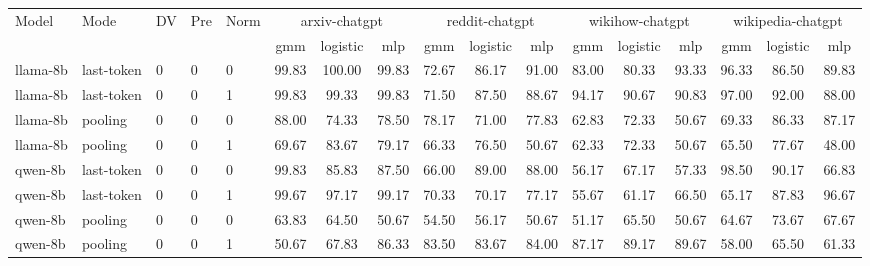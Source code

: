 \begin{tabular}{lllll|ccc|ccc|ccc|ccc}
\toprule
Model & Mode & DV & Pre & Norm & \multicolumn{3}{c}{arxiv-chatgpt} & \multicolumn{3}{c}{reddit-chatgpt} & \multicolumn{3}{c}{wikihow-chatgpt} & \multicolumn{3}{c}{wikipedia-chatgpt} \\
 &  &  &  &  & gmm & logistic & mlp & gmm & logistic & mlp & gmm & logistic & mlp & gmm & logistic & mlp \\
\midrule
llama-8b & last-token & 0 & 0 & 0 & 99.83 & 100.00 & 99.83 & 72.67 & 86.17 & 91.00 & 83.00 & 80.33 & 93.33 & 96.33 & 86.50 & 89.83 \\
llama-8b & last-token & 0 & 0 & 1 & 99.83 & 99.33 & 99.83 & 71.50 & 87.50 & 88.67 & 94.17 & 90.67 & 90.83 & 97.00 & 92.00 & 88.00 \\
llama-8b & pooling & 0 & 0 & 0 & 88.00 & 74.33 & 78.50 & 78.17 & 71.00 & 77.83 & 62.83 & 72.33 & 50.67 & 69.33 & 86.33 & 87.17 \\
llama-8b & pooling & 0 & 0 & 1 & 69.67 & 83.67 & 79.17 & 66.33 & 76.50 & 50.67 & 62.33 & 72.33 & 50.67 & 65.50 & 77.67 & 48.00 \\
qwen-8b & last-token & 0 & 0 & 0 & 99.83 & 85.83 & 87.50 & 66.00 & 89.00 & 88.00 & 56.17 & 67.17 & 57.33 & 98.50 & 90.17 & 66.83 \\
qwen-8b & last-token & 0 & 0 & 1 & 99.67 & 97.17 & 99.17 & 70.33 & 70.17 & 77.17 & 55.67 & 61.17 & 66.50 & 65.17 & 87.83 & 96.67 \\
qwen-8b & pooling & 0 & 0 & 0 & 63.83 & 64.50 & 50.67 & 54.50 & 56.17 & 50.67 & 51.17 & 65.50 & 50.67 & 64.67 & 73.67 & 67.67 \\
qwen-8b & pooling & 0 & 0 & 1 & 50.67 & 67.83 & 86.33 & 83.50 & 83.67 & 84.00 & 87.17 & 89.17 & 89.67 & 58.00 & 65.50 & 61.33 \\
\bottomrule
\end{tabular}